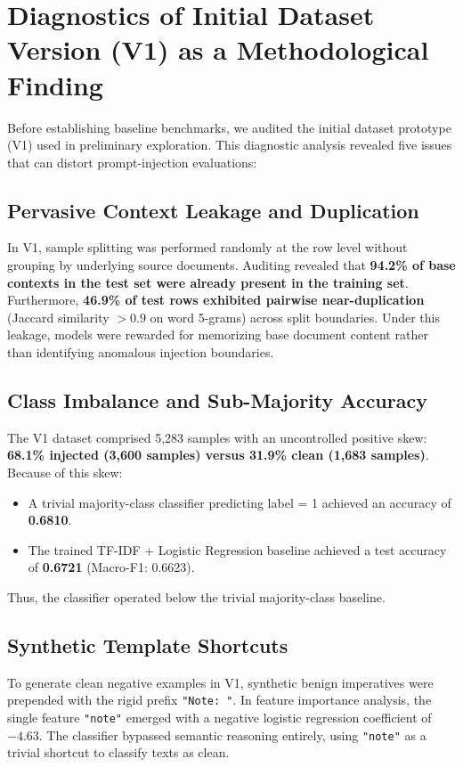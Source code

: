 \documentclass[10pt,conference]{IEEEtran}
\begin{document}
\section{Diagnostics of Initial Dataset Version (V1) as a Methodological Finding}
\label{sec:diagnostics}

Before establishing baseline benchmarks, we audited the initial dataset prototype (V1) used in preliminary exploration. This diagnostic analysis revealed five issues that can distort prompt-injection evaluations:

\subsection{Pervasive Context Leakage and Duplication}
In V1, sample splitting was performed randomly at the row level without grouping by underlying source documents. 
Auditing revealed that \textbf{94.2\% of base contexts in the test set were already present in the training set}. Furthermore, \textbf{46.9\% of test rows exhibited pairwise near-duplication} (Jaccard similarity $>0.9$ on word 5-grams) across split boundaries. Under this leakage, models were rewarded for memorizing base document content rather than identifying anomalous injection boundaries.

\subsection{Class Imbalance and Sub-Majority Accuracy}
The V1 dataset comprised 5,283 samples with an uncontrolled positive skew: \textbf{68.1\% injected (3,600 samples) versus 31.9\% clean (1,683 samples)}. Because of this skew:
\begin{itemize}
    \item A trivial majority-class classifier predicting label = 1 achieved an accuracy of \textbf{0.6810}.
    \item The trained TF-IDF + Logistic Regression baseline achieved a test accuracy of \textbf{0.6721} (Macro-F1: 0.6623).
\end{itemize}
Thus, the classifier operated below the trivial majority-class baseline.

\subsection{Synthetic Template Shortcuts}
To generate clean negative examples in V1, synthetic benign imperatives were prepended with the rigid prefix \texttt{"Note: "}. In feature importance analysis, the single feature \texttt{"note"} emerged with a negative logistic regression coefficient of \textbf{$-4.63$}. The classifier bypassed semantic reasoning entirely, using \texttt{"note"} as a trivial shortcut to classify texts as clean.
\end{document}
